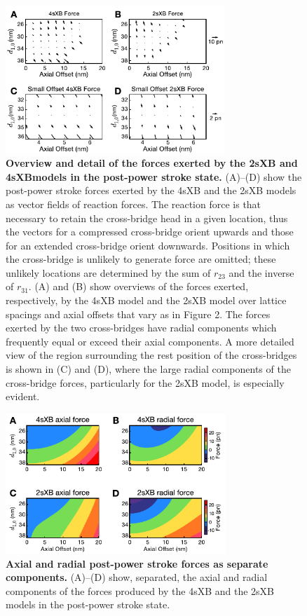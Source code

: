 \documentclass[10pt]{article}
\begin{document}
\begin{figure}[!ht]
    \begin{center}
    \includegraphics[width=3.25in]{../imgs/fig_forces.pdf}
    \caption{ \textbf{Overview and detail of the forces exerted by the 2sXB and 4sXB\@ models in the post-power stroke state.}
        (A)--(D) show the post-power stroke forces exerted by the 4sXB and the 2sXB models as vector fields of reaction forces. 
        The reaction force is that necessary to retain the cross-bridge head in a given location, thus the vectors for a compressed cross-bridge orient upwards and those for an extended cross-bridge orient downwards.
        Positions in which the cross-bridge is unlikely to generate force are omitted; these unlikely locations are determined by the sum of $r_{23}$ and the inverse of $r_{31}$. 
        (A) and (B) show overviews of the forces exerted, respectively, by the 4sXB model and the 2sXB model over lattice spacings and axial offsets that vary as in Figure 2. 
        The forces exerted by the two cross-bridges have radial components which frequently equal or exceed their axial components. 
        A more detailed view of the region surrounding the rest position of the cross-bridges is shown in (C) and (D), where the large radial components of the cross-bridge forces, particularly for the 2sXB model, is especially evident.  
        \label{fig_forces}
        }
    \end{center}
\end{figure}

\begin{figure}[!ht]
    \begin{center}
    \includegraphics[width=8.3cm]{../imgs/fig_force_contours.pdf}
    \caption{ \textbf{Axial and radial post-power stroke forces as separate components.}
        (A)--(D) show, separated, the axial and radial components of the forces produced by the 4sXB and the 2sXB models in the post-power stroke state.
        \label{fig_force_contours}
           }
    \end{center}
\end{figure}
\end{document}
